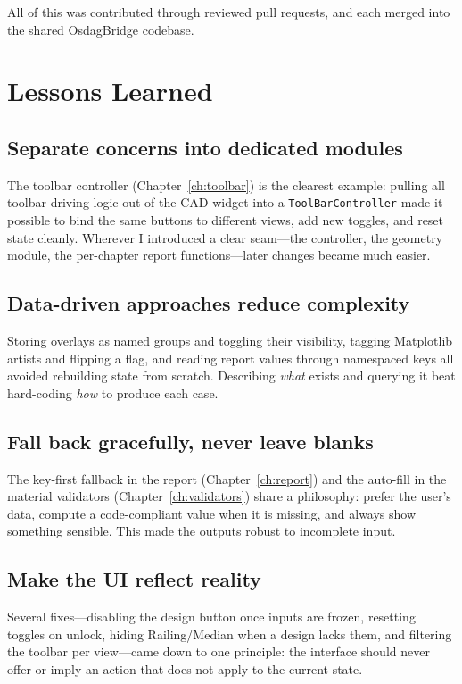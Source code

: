 All of this was contributed through reviewed pull requests, and each merged into the shared
OsdagBridge codebase.

\section{Lessons Learned}

\subsection{Separate concerns into dedicated modules}
The toolbar controller (Chapter~\ref{ch:toolbar}) is the clearest example: pulling all
toolbar-driving logic out of the CAD widget into a \texttt{ToolBarController} made it possible to
bind the same buttons to different views, add new toggles, and reset state cleanly. Wherever I
introduced a clear seam---the controller, the geometry module, the per-chapter report
functions---later changes became much easier.

\subsection{Data-driven approaches reduce complexity}
Storing overlays as named groups and toggling their visibility, tagging Matplotlib artists and
flipping a flag, and reading report values through namespaced keys all avoided rebuilding state
from scratch. Describing \emph{what} exists and querying it beat hard-coding \emph{how} to
produce each case.

\subsection{Fall back gracefully, never leave blanks}
The key-first fallback in the report (Chapter~\ref{ch:report}) and the auto-fill in the material
validators (Chapter~\ref{ch:validators}) share a philosophy: prefer the user's data, compute a
code-compliant value when it is missing, and always show something sensible. This made the
outputs robust to incomplete input.

\subsection{Make the UI reflect reality}
Several fixes---disabling the design button once inputs are frozen, resetting toggles on unlock,
hiding Railing/Median when a design lacks them, and filtering the toolbar per view---came down to
one principle: the interface should never offer or imply an action that does not apply to the
current state.

